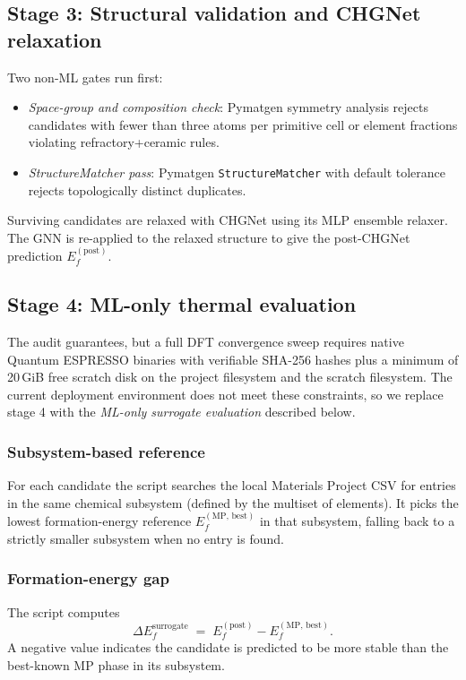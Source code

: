 \documentclass[11pt,a4paper]{article}
\begin{document}
\subsection{Stage 3: Structural validation and CHGNet relaxation}
\label{sec:m3}

Two non-ML gates run first:
\begin{itemize}[noitemsep]
  \item \emph{Space-group and composition check}: Pymatgen symmetry
        analysis rejects candidates with fewer than three atoms per
        primitive cell or element fractions violating
        refractory+ceramic rules.
  \item \emph{StructureMatcher pass}: Pymatgen
        \texttt{StructureMatcher} with default tolerance rejects
        topologically distinct duplicates.
\end{itemize}

Surviving candidates are relaxed with CHGNet using its MLP ensemble
relaxer. The GNN is re-applied to the relaxed structure to give the
post-CHGNet prediction $E_f^{(\mathrm{post})}$.

\subsection{Stage 4: ML-only thermal evaluation}
\label{sec:surrogate}

The audit guarantees, but a full DFT convergence sweep requires
native Quantum ESPRESSO binaries with verifiable SHA-256 hashes plus a
minimum of 20\,GiB free scratch disk on the project filesystem and the
scratch filesystem. The current deployment environment does not meet
these constraints, so we replace stage 4 with the
\emph{ML-only surrogate evaluation} described below.

\subsubsection{Subsystem-based reference}
For each candidate the script searches the local Materials Project CSV
 for entries in the same chemical
subsystem (defined by the multiset of elements). It picks the lowest
formation-energy reference $E_f^{(\mathrm{MP,\,best})}$ in that
subsystem, falling back to a strictly smaller subsystem when no entry
is found.

\subsubsection{Formation-energy gap}
The script computes
\begin{equation}
\Delta E^{\mathrm{surrogate}}_{f}
  \;=\; E_f^{(\mathrm{post})}
        - E_f^{(\mathrm{MP,\,best})}.
\label{eq:gap}
\end{equation}
A negative value indicates the candidate is predicted to be more
stable than the best-known MP phase in its subsystem.
\end{document}
